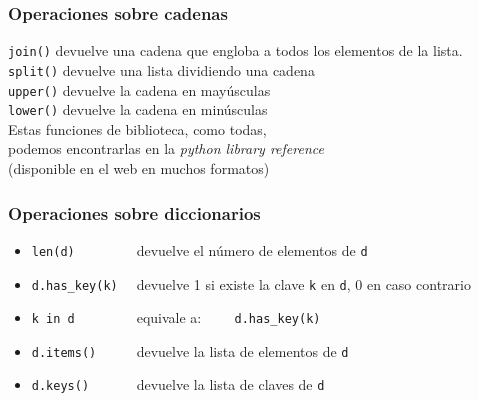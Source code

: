 \begin{frame}[fragile]
\frametitle{Operaciones sobre cadenas}
\verb|join()| devuelve una cadena que engloba a todos los elementos de la lista.\\
\verb|split()| devuelve una lista dividiendo una cadena\\
\verb|upper()| devuelve la cadena en mayúsculas\\
\verb|lower()| devuelve la cadena en minúsculas\\

Estas funciones de biblioteca, como todas,\\ podemos encontrarlas
en la \emph{python library reference}\\
(disponible en el web en muchos formatos)

\end{frame}

\begin{frame}[fragile]
\frametitle{Operaciones sobre diccionarios}

\begin{footnotesize}
  \begin{itemize}
  \item \verb|len(d)        | devuelve el número de elementos de \verb|d|
  \item \verb|d.has_key(k)  | devuelve 1 si existe la clave \verb|k| en
    \verb|d|, 0 en caso contrario
  \item \verb|k in d        | equivale a: \verb|    d.has_key(k)|
  \item \verb|d.items()     | devuelve la lista de elementos de \verb|d|
  \item \verb|d.keys()      | devuelve la lista de claves de \verb|d|
  \end{itemize}
\end{footnotesize}
\end{frame}






